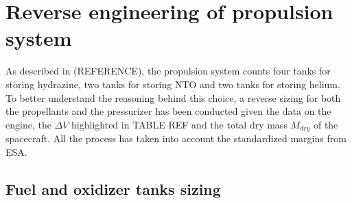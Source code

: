 \section{Reverse engineering of propulsion system}
\label{sec:reverse_prop}

As described in (REFERENCE), the propulsion system counts four tanks for storing hydrazine, two tanks for storing NTO and two tanks for storing helium.
To better understand the reasoning behind this choice, a reverse sizing for both the propellants and the pressurizer has been conducted given the data on the engine, the $\Delta V$ highlighted in TABLE REF and the total dry mass $M_{dry}$ of the spacecraft.
All the process has taken into account the standardized margins from ESA. \cite{esa_margins}

\subsection{Fuel and oxidizer tanks sizing}
\label{subsec:fuel_ox_sizing}


